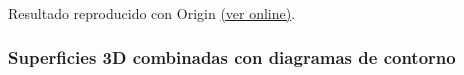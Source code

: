 \documentclass{article}
\begin{document}
    \begin{center}
    \end{center}
    { \hspace*{\fill} \\}
    
    Resultado reproducido con Origin
\href{http://cloud.originlab.com/www/resources/graph_gallery/images_galleries_new/3d_surface_from_virtual_matrix_opengl.png}{(ver
online)}.


    \subsubsection{Superficies 3D combinadas con diagramas de contorno}
\end{document}
